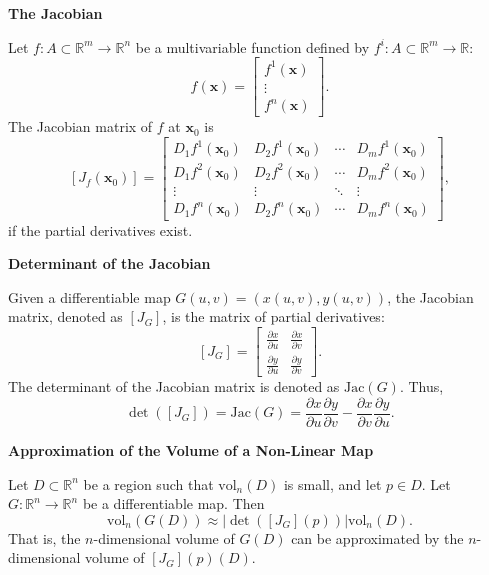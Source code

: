 \documentclass{article}
\newcommand{\R}{\mathbb{R}}
\newenvironment{definition}[1]{
    \par\noindent\textbf{#1}\par\noindent
}{
    \par \vspace{0.5cm}
}
\begin{document}
\begin{definition}{The Jacobian}
Let \( f : A \subset \R^m \rightarrow \R^n \) be a multivariable function defined by \( f^i : A \subset \R^m \rightarrow \R \):
\[
f(\bm{x}) =
\begin{bmatrix}
    f^1(\bm{x}) \\
    \vdots \\
    f^n(\bm{x})
\end{bmatrix}.
\]
The Jacobian matrix of \( f \) at \( \bm{x}_0 \) is
\[
[J_f (\bm{x}_0)] =
\begin{bmatrix}
    D_1f^1(\bm{x}_0) & D_2f^1(\bm{x}_0) & \cdots & D_mf^1(\bm{x}_0) \\
    D_1f^2(\bm{x}_0) & D_2f^2(\bm{x}_0) & \cdots & D_mf^2(\bm{x}_0) \\
    \vdots & \vdots & \ddots & \vdots \\
    D_1f^n(\bm{x}_0) & D_2f^n(\bm{x}_0) & \cdots & D_mf^n(\bm{x}_0)
\end{bmatrix},
\]
if the partial derivatives exist.
\end{definition}


\begin{definition}{Determinant of the Jacobian}
    Given a differentiable map \( G(u,v) = (x(u,v),y(u,v)) \), the Jacobian matrix, denoted as \([J_G]\), is the matrix of partial derivatives:
    \[
    [J_G] = 
    \begin{bmatrix}
    \frac{\partial x}{\partial u} & \frac{\partial x}{\partial v} \\
    \frac{\partial y}{\partial u} & \frac{\partial y}{\partial v}
    \end{bmatrix}.
    \]
    The determinant of the Jacobian matrix is denoted as \(\text{Jac}(G)\). Thus,
    \[
    \det([J_G]) = \text{Jac}(G) = \frac{\partial x}{\partial u} \frac{\partial y}{\partial v} - \frac{\partial x}{\partial v} \frac{\partial y}{\partial u}.
    \]
\end{definition}

\begin{definition}{Approximation of the Volume of a Non-Linear Map}
Let \( D \subset \R^n \) be a region such that \( \text{vol}_n(D) \) is small, and let \( p \in D \). Let \( G : \R^n \rightarrow \R^n \) be a differentiable map. Then
\[
\text{vol}_n(G(D)) \approx \left| \det\left([J_G](p)\right) \right| \text{vol}_n(D).
\]
That is, the \( n \)-dimensional volume of \( G(D) \) can be approximated by the \( n \)-dimensional volume of \( [J_G](p)(D) \).
\end{definition}
\end{document}
